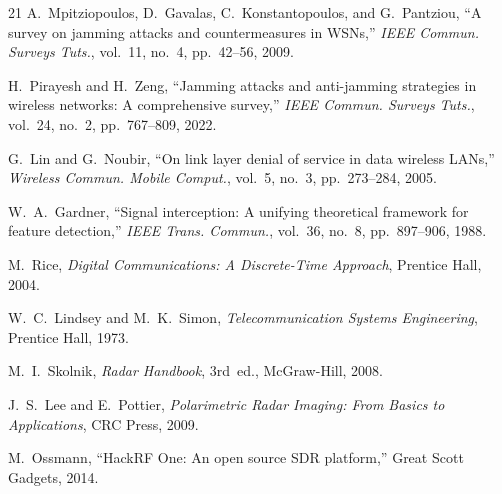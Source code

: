 \documentclass[conference]{IEEEtran}
\begin{document}
\begin{thebibliography}{21}
A.~Mpitziopoulos, D.~Gavalas, C.~Konstantopoulos, and G.~Pantziou, ``A survey on jamming attacks and countermeasures in WSNs,'' \textit{IEEE Commun. Surveys Tuts.}, vol.~11, no.~4, pp.~42--56, 2009.

H.~Pirayesh and H.~Zeng, ``Jamming attacks and anti-jamming strategies in wireless networks: A comprehensive survey,'' \textit{IEEE Commun. Surveys Tuts.}, vol.~24, no.~2, pp.~767--809, 2022.

G.~Lin and G.~Noubir, ``On link layer denial of service in data wireless LANs,'' \textit{Wireless Commun. Mobile Comput.}, vol.~5, no.~3, pp.~273--284, 2005.

W.~A.~Gardner, ``Signal interception: A unifying theoretical framework for feature detection,'' \textit{IEEE Trans. Commun.}, vol.~36, no.~8, pp.~897--906, 1988.

M.~Rice, \textit{Digital Communications: A Discrete-Time Approach}, Prentice Hall, 2004.

W.~C.~Lindsey and M.~K.~Simon, \textit{Telecommunication Systems Engineering}, Prentice Hall, 1973.

M.~I.~Skolnik, \textit{Radar Handbook}, 3rd~ed., McGraw-Hill, 2008.

J.~S.~Lee and E.~Pottier, \textit{Polarimetric Radar Imaging: From Basics to Applications}, CRC Press, 2009.

M.~Ossmann, ``HackRF One: An open source SDR platform,'' Great Scott Gadgets, 2014.

\end{thebibliography}
\end{document}
